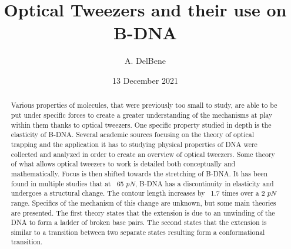 \documentclass[%
 aip,
 amsmath,amssymb,
 reprint,%
]{revtex4-1}
\begin{document}

\title{Optical Tweezers and their use on B-DNA}
\author{A. DelBene}


\date{13 December 2021}

\begin{abstract}
    Various properties of molecules, that were previously too small to study, are able to be put under specific forces to create a greater understanding of the mechanisms at play within them thanks to optical tweezers. One specific property studied in depth is the elasticity of B-DNA. Several academic sources focusing on the theory of optical trapping and the application it has to studying physical properties of DNA were collected and analyzed in order to create an overview of optical tweezers. Some theory of what allows optical tweezers to work is detailed both conceptually and mathematically. Focus is then shifted towards the stretching of B-DNA. It has been found in multiple studies that at ~65 $pN$, B-DNA has a discontinuity in elasticity and undergoes a structural change. The contour length increases by ~1.7 times over a 2 $pN$ range. Specifics of the mechanism of this change are unknown, but some main theories are presented. The first theory states that the extension is due to an unwinding of the DNA to form a ladder of broken base pairs. The second states that the extension is similar to a transition between two separate states resulting form a conformational transition.


\end{abstract}

\maketitle
\end{document}
